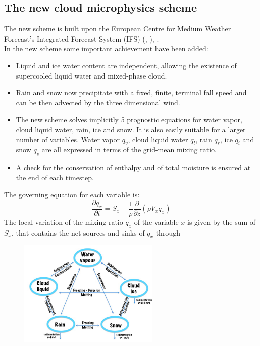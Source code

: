 {\subsection{The new cloud microphysics scheme}

The new scheme is built upon the European Centre for Medium Weather Forecast's Integrated Forecast System (IFS) (\citet{tiedtke:93}, \citet{tompkins:07}),
\citet{gmd-9-2533-2016}. \\
In the new scheme some important achievement have been added:
\begin{itemize}
\item Liquid and ice water content are independent, allowing the existence of supercooled liquid water and mixed-phase cloud.
\item Rain and snow now precipitate with a fixed, finite, terminal fall speed and can be then advected by the three dimensional wind.
\item The new scheme solves implicitly 5 prognostic equations for water vapor, cloud liquid water, rain, ice and snow. It is also easily suitable for a larger number of variables. Water vapor $q_v$, cloud liquid water $q_l$, rain $q_r$, ice $q_i$ and snow $q_s$ are all expressed in terms of the grid-mean mixing ratio.
\item A check for the conservation of enthalpy and of total moisture is ensured
at the end of each timestep.
\end{itemize}
The governing equation for each variable is:
\begin{equation}
\frac{\partial q_x}{\partial t}= S_x +\frac{1}{\rho}\frac{\partial}{\partial z}(\rho V_x q_x)
\end{equation}
The local variation of the mixing ratio $q_x$ of the variable $x$ is given by the sum of $S_x$, that contains the net sources and sinks of $q_x$ through 
\begin{figure} [htpb!]%
\begin{center}
\includegraphics[width=0.6\textwidth]{scheme_var2.jpg}

\end{center}
\end{figure}}
